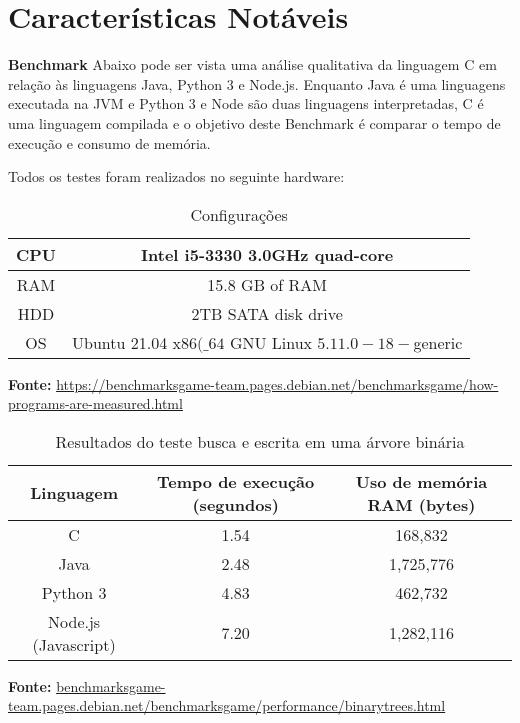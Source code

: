 \chapter{Características Notáveis}


\textbf{Benchmark}
Abaixo pode ser vista uma análise qualitativa da linguagem C
 em relação às linguagens Java, Python 3  e Node.js. Enquanto Java é uma linguagens executada na JVM 
 e Python 3 e Node são duas linguagens interpretadas, C é uma linguagem compilada e o 
 objetivo deste Benchmark é comparar o tempo de execução e consumo de memória. 


Todos os testes foram realizados no seguinte hardware:

\begin{table}[ht]
    \centering
    \caption{Configurações}
    \begin{tabular}{| c | c |}
        \hline 
        CPU & Intel i5-3330 3.0GHz quad-core\\
        \hline
        RAM & 15.8 GB of RAM \\
        \hline 
        HDD & 2TB SATA disk drive \\
        \hline
        OS & Ubuntu 21.04 x\(86(\_64\) GNU Linux \(5.11.0-18-\)generic \\
        \hline   
    \end{tabular}
\end{table}

\textbf{Fonte:} \url{https://benchmarksgame-team.pages.debian.net/benchmarksgame/how-programs-are-measured.html}

\begin{table}[ht]
    \centering
    \caption{Resultados do teste busca e escrita em uma árvore binária}
    \begin{tabular}{| c | c | c |}
        \hline 
        Linguagem & Tempo de execução (segundos)
        & Uso de memória RAM (bytes) \\
        \hline
        C & 1.54 & 168,832 \\
        \hline 
        Java & 2.48 & 1,725,776 \\
        \hline
        Python 3 & 4.83 & 462,732 \\
        \hline
        Node.js (Javascript) & 7.20 & 1,282,116\\ 
        \hline        
    \end{tabular}
    \textbf{Fonte:} \url{benchmarksgame-team.pages.debian.net/benchmarksgame/performance/binarytrees.html}
\end{table}

